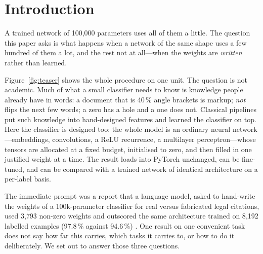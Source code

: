 \documentclass[11pt]{article}
\begin{document}
\section{Introduction}
A trained network of 100{,}000 parameters uses all of them a little. The
question this paper asks is what happens when a network of the same shape uses a
few hundred of them a lot, and the rest not at all---when the weights are
\emph{written} rather than learned.

Figure~\ref{fig:teaser} shows the whole procedure on one unit. The question is not academic. Much of what a small classifier needs to know is
knowledge people already have in words: a document that is 40\,\% angle brackets
is markup; \emph{not} flips the next few words; a zero has a hole and a one does
not. Classical pipelines put such knowledge into hand-designed features and
learned the classifier on top. Here the classifier is designed too: the whole
model is an ordinary neural network---embeddings, convolutions, a ReLU
recurrence, a multilayer perceptron---whose tensors are allocated at a fixed
budget, initialised to zero, and then filled in one justified weight at a time.
The result loads into PyTorch unchanged, can be fine-tuned, and can be compared
with a trained network of identical architecture on a per-label basis.

The immediate prompt was a report that a language model, asked to hand-write
the weights of a 100k-parameter classifier for real versus fabricated legal
citations, used 3{,}793 non-zero weights and outscored the same architecture
trained on 8{,}192 labelled examples (97.8\,\% against 94.6\,\%)
\cite{lauritzen2026fable}. One result on one convenient task does not say how
far this carries, which tasks it carries to, or how to do it deliberately. We
set out to answer those three questions.
\end{document}
